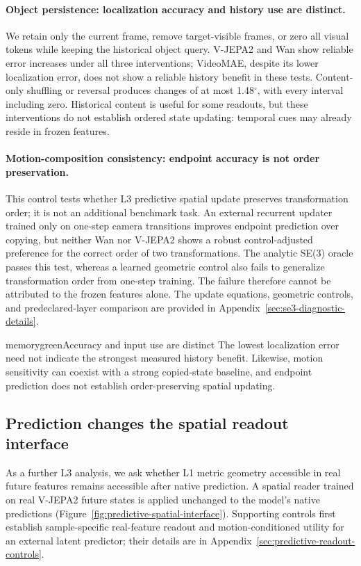 \documentclass{article} %
\begin{document}
\paragraph{Object persistence: localization accuracy and history use are distinct.}
We retain only the current frame, remove target-visible frames, or zero all
visual tokens while keeping the historical object query. V-JEPA2 and Wan
show reliable error increases under all three interventions; VideoMAE,
despite its lower localization error, does not show a reliable history
benefit in these tests. Content-only shuffling or reversal produces changes
of at most 1.48$^{\circ}$, with every interval including zero. Historical
content is useful for some readouts, but these interventions do not establish
ordered state updating: temporal cues may already reside in frozen features.

\paragraph{Motion-composition consistency: endpoint accuracy is not order preservation.}
This control tests whether L3 predictive spatial update preserves
transformation order; it is not an additional benchmark task. An external
recurrent updater trained only on one-step camera transitions
improves endpoint prediction over copying, but neither Wan nor V-JEPA2
shows a robust control-adjusted preference for the correct order of two
transformations. The analytic SE(3) oracle passes this test, whereas a
learned geometric control also fails to generalize transformation order
from one-step training. The failure therefore cannot be attributed to the
frozen features alone. The update equations, geometric controls, and
predeclared-layer comparison are provided in
Appendix~\ref{sec:se3-diagnostic-details}.

\begin{keyfinding}{memorygreen}{Accuracy and input use are distinct}
The lowest localization error need not indicate the strongest measured
history benefit. Likewise, motion sensitivity can coexist with a strong
copied-state baseline, and endpoint prediction does not establish
order-preserving spatial updating.
\end{keyfinding}


\subsection{Prediction changes the spatial readout interface}
\label{sec:predictive-spatial-interface}
\label{sec:representation-specific}
As a further L3 analysis, we ask whether L1 metric geometry accessible in real
future features remains accessible after native prediction. A spatial reader trained on real
V-JEPA2 future states is applied unchanged to the model's native predictions
(Figure~\ref{fig:predictive-spatial-interface}). Supporting controls first
establish sample-specific real-feature readout and motion-conditioned
utility for an external latent predictor; their details are in
Appendix~\ref{sec:predictive-readout-controls}.
\end{document}
